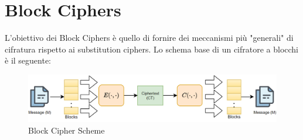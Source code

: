 \chapter{Block Ciphers}\label{chap:blkcipher}
L'obiettivo dei Block Ciphers è quello di fornire dei meccanismi più "generali" di cifratura rispetto ai substitution ciphers. Lo schema base di un cifratore a blocchi è il seguente:
\begin{figure}[h]
    \centering
    \includegraphics[width=\linewidth]{image/blockcipher.png}
    \caption{Block Cipher Scheme}
    \label{fig:blkcipher}
\end{figure}
